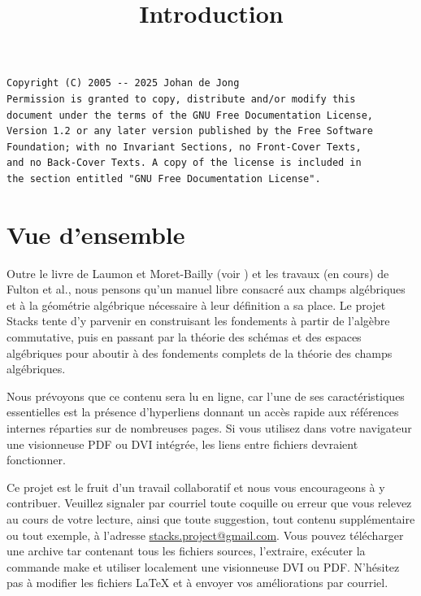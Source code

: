 

%


\title{Introduction}


\maketitle

\label{section-phantom}

\begin{verbatim}
Copyright (C) 2005 -- 2025 Johan de Jong
Permission is granted to copy, distribute and/or modify this
document under the terms of the GNU Free Documentation License,
Version 1.2 or any later version published by the Free Software
Foundation; with no Invariant Sections, no Front-Cover Texts,
and no Back-Cover Texts. A copy of the license is included in
the section entitled "GNU Free Documentation License".
\end{verbatim}

\tableofcontents


\section{Vue d'ensemble}
\label{section-overview}

\noindent
Outre le livre de Laumon et Moret-Bailly (voir \cite{LM-B}) et les travaux
(en cours) de Fulton et al., nous pensons qu'un manuel libre consacr\'e aux
champs alg\'ebriques et \`a la g\'eom\'etrie alg\'ebrique n\'ecessaire \`a leur
d\'efinition a sa place. Le projet Stacks tente d'y parvenir en construisant les
fondements \`a partir de l'alg\`ebre commutative, puis en passant par la
th\'eorie des sch\'emas et des espaces alg\'ebriques pour aboutir \`a des
fondements complets de la th\'eorie des champs alg\'ebriques.

\medskip\noindent
Nous pr\'evoyons que ce contenu sera lu en ligne, car l'une de ses
caract\'eristiques essentielles est la pr\'esence d'hyperliens donnant un
acc\`es rapide aux r\'ef\'erences internes r\'eparties sur de nombreuses pages.
Si vous utilisez dans votre navigateur une visionneuse PDF ou DVI int\'egr\'ee,
les liens entre fichiers devraient fonctionner.

\medskip\noindent
Ce projet est le fruit d'un travail collaboratif et nous vous encourageons
\`a y contribuer. Veuillez signaler par courriel toute coquille ou erreur
que vous relevez au cours de votre lecture, ainsi que toute suggestion,
tout contenu suppl\'ementaire ou tout exemple, \`a l'adresse
\href{mailto:stacks.project@gmail.com}{stacks.project@gmail.com}.
Vous pouvez t\'el\'echarger une archive tar contenant tous les fichiers sources,
l'extraire, ex\'ecuter la commande make et utiliser localement une visionneuse DVI ou PDF.
N'h\'esitez pas \`a modifier les fichiers LaTeX et \`a envoyer vos am\'eliorations
par courriel.


